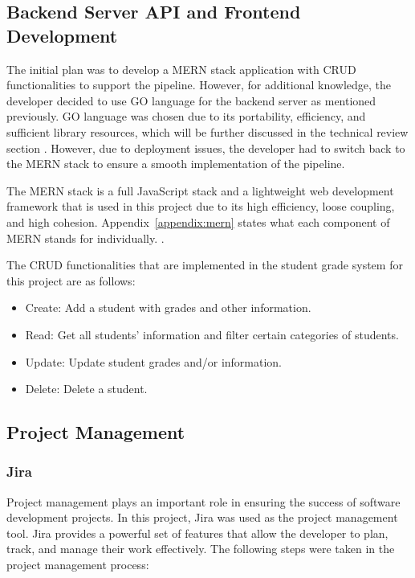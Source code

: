 \subsection{Backend Server API and Frontend Development}
The initial plan was to develop a MERN stack application with CRUD functionalities to support the pipeline. However, for additional knowledge, the developer decided to use GO language for the backend server as mentioned previously. GO language was chosen due to its portability, efficiency, and sufficient library resources, which will be further discussed in the technical review section \cite{mihalis, andrew, cgptt}. However, due to deployment issues, the developer had to switch back to the MERN stack to ensure a smooth implementation of the pipeline.

The MERN stack is a full JavaScript stack and a lightweight web development framework that is used in this project due to its high efficiency, loose coupling, and high cohesion. Appendix~\ref{appendix:mern} states what each component of MERN stands for individually. \cite{eddy, shama}.

The CRUD functionalities that are implemented in the student grade system for this project are as follows:

\begin{itemize}
\item Create: Add a student with grades and other information.
\item Read: Get all students' information and filter certain categories of students.
\item Update: Update student grades and/or information.
\item Delete: Delete a student.
\end{itemize}

\subsection{Project Management}
\subsubsection{Jira}

Project management plays an important role in ensuring the success of software development projects. In this project, Jira was used as the project management tool. Jira provides a powerful set of features that allow the developer to plan, track, and manage their work effectively. The following steps were taken in the project management process:

